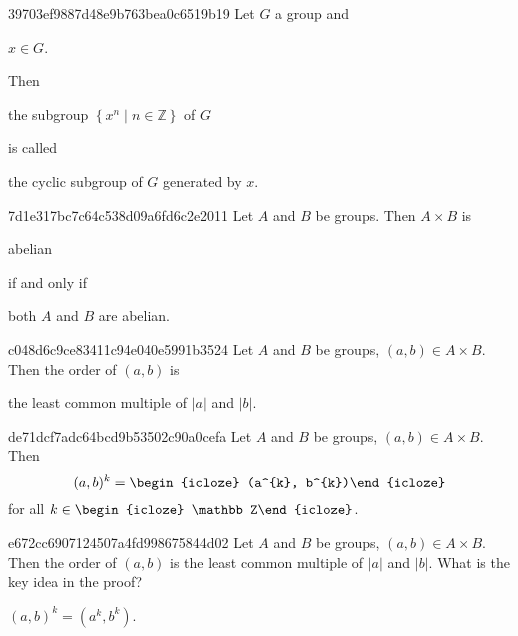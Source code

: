 \begin{note}{39703ef9887d48e9b763bea0c6519b19}
    Let \({ G }\) a group and \begin{icloze}{3}\({ x \in G }\).\end{icloze} Then \begin{icloze}{2}the subgroup \({ \left\{ x^{n} \mid n \in \mathbb Z \right\} }\) of \({ G }\)\end{icloze} is called \begin{icloze}{1}the cyclic subgroup of \({ G }\) generated by \({ x }\).\end{icloze}
\end{note}

\begin{note}{7d1e317bc7c64c538d09a6fd6c2e2011}
    Let \({ A }\) and \({ B }\) be groups. Then \({ A \times B }\) is \begin{icloze}{3}abelian\end{icloze} \begin{icloze}{2}if and only if\end{icloze} \begin{icloze}{1}both \({ A }\) and \({ B }\) are abelian.\end{icloze}
\end{note}

\begin{note}{c048d6c9ce83411c94e040e5991b3524}
    Let \({ A }\) and \({ B }\) be groups, \({ (a, b) \in A \times B }\).
    Then the order of \({ (a, b) }\) is \begin{icloze}{1}the least common multiple of \({ \left\lvert a \right\rvert }\) and \({ \left\lvert b \right\rvert }\).\end{icloze}
\end{note}

\begin{note}{de71dcf7adc64bcd9b53502c90a0cefa}
    Let \({ A }\) and \({ B }\) be groups, \({ (a, b) \in A \times B }\).
    Then
    \[
        (a, b)^{k} = \begin{icloze}{1}(a^{k}, b^{k})\end{icloze}
    \]
    for all \({ k \in \begin{icloze}{2}\mathbb Z\end{icloze} }\).
\end{note}

\begin{note}{e672cc6907124507a4fd998675844d02}
    Let \({ A }\) and \({ B }\) be groups, \({ (a, b) \in A \times B }\).
    Then the order of \({ (a, b) }\) is the least common multiple of \({ \left\lvert a \right\rvert }\) and \({ \left\lvert b \right\rvert }\).
    What is the key idea in the proof?

    \begin{cloze}{1}
        \({ (a, b)^{k} = (a^{k}, b^{k}) }\).
    \end{cloze}
\end{note}

